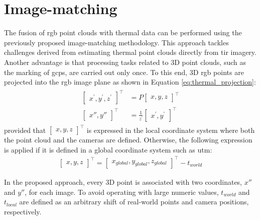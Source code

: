 \section{Image-matching}

The fusion of \acrshort{rgb} point clouds with thermal data can be performed using the previously proposed image-matching methodology. This approach tackles challenges derived from estimating thermal point clouds directly from \acrshort{tir} imagery. Another advantage is that processing tasks related to 3D point clouds, such as the marking of \acrshort{gcp}s, are carried out only once. To this end, 3D \acrshort{rgb} points are projected into the \acrshort{rgb} image plane as shown in Equation \ref{eq:thermal_projection}:
\begin{gather}
    \label{eq:thermal_projection}
    \begin{aligned}
        \begin{bmatrix} x^\prime, y^\prime, z^\prime \end{bmatrix}^\intercal &= P \begin{bmatrix} x, y, z\end{bmatrix}^\intercal\\
        \begin{bmatrix} x'', y'' \end{bmatrix}^\intercal &= \frac{1}{z^\prime} \begin{bmatrix} x^\prime, y^\prime \end{bmatrix}^\intercal
    \end{aligned}
\end{gather}
provided that $\begin{bmatrix} x, y, z\end{bmatrix}^\intercal$ is expressed in the local coordinate system where both the point cloud and the cameras are defined. Otherwise, the following expression is applied if it is defined in a global coordinate system such as \acrshort{utm}:
\begin{gather}
    \label{eq:thermal_projection_2}
    \begin{bmatrix} x, y, z \end{bmatrix}^\intercal = \begin{bmatrix} x_{\textit{global}}, y_{\textit{global}}, z_{\textit{global}} \end{bmatrix}^\intercal - t_{\textit{world}}
\end{gather}

In the proposed approach, every 3D point is associated with two coordinates, $x''$ and $y''$, for each image. To avoid operating with large numeric values, $t_{\textit{world}}$ and $t_{\textit{local}}$ are defined as an arbitrary shift of real-world points and camera positions, respectively.

